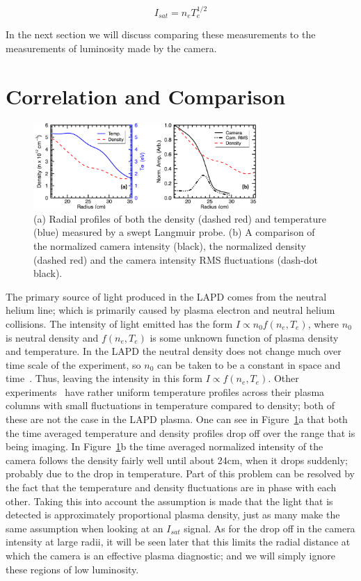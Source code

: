 \documentclass[%
 reprint,
 amsmath,amssymb,
 aps,
]{revtex4-1}
\begin{document}
\begin{equation} I_{sat}=n_e T_e^{1/2}
\label{eq:one}
\end{equation}

In the next section we will discuss comparing these measurements to the measurements of luminosity made by the camera.


%
%
%
\section{\label{sec:level1}Correlation and Comparison}


\begin{figure}[!htbp]
\centerline{}
\includegraphics[width=8.5cm]{plot_dens_lum_temp_4_0V}
\caption{\label{fig:plot_dens_lum_temp_4_0V}  (a) Radial profiles of both the density (dashed red) and temperature (blue) measured by a swept Langmuir probe.  (b) A comparison of the normalized camera intensity (black), the normalized density (dashed red)  and the camera intensity RMS fluctuations (dash-dot black). }
\end{figure}

The primary source of light produced in the LAPD comes from the neutral helium line; which is primarily caused by plasma electron and neutral helium collisions. The intensity of light emitted has the form $I \propto n_0f(n_e, T_e)$, where $n_0$ is neutral density and $f(n_e, T_e)$ is some unknown function of plasma density and temperature. In the LAPD the neutral density does not change much over time scale of the experiment, so $n_0$ can be taken to be a constant in space and time~\cite{maggs07}. Thus, leaving the intensity in this form $I \propto f(n_e, T_e)$.  Other experiments~\cite{antar07, light13} have rather uniform temperature profiles across their plasma columns with small fluctuations in temperature compared to density; both of these are not the case in the LAPD plasma. One can see in Figure~\ref{fig:plot_dens_lum_temp_4_0V}a that both the time averaged temperature and density profiles drop off over the range that is being imaging.  In Figure~\ref{fig:plot_dens_lum_temp_4_0V}b the time averaged normalized intensity of the camera follows the density fairly well until about 24cm, when it drops suddenly; probably due to the drop in temperature.  Part of this problem can be resolved by the fact that the temperature and density fluctuations are in phase with each other. Taking this into account the assumption is made that the light that is detected is approximately proportional plasma density, just as many make the same assumption when looking at an $I_{sat}$ signal. As for the drop off in the camera intensity at large radii, it will be seen later that this limits the radial distance at which the camera is an effective plasma diagnostic; and we will simply ignore these regions of low luminosity.
\end{document}
